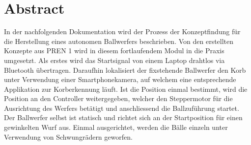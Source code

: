 
\section*{Abstract}
In der nachfolgenden Dokumentation wird der Prozess der Konzeptfindung für die Herstellung eines
autonomen Ballwerfers beschrieben. Von den erstellten Konzepte aus PREN 1 wird in diesem fortlaufendem Modul in die Praxis umgesetzt.
Als
erstes wird das Startsignal von einem Laptop drahtlos via Bluetooth übertragen. Daraufhin lokalisiert
der fixstehende Ballwerfer den Korb unter Verwendung einer Smartphonekamera, auf welchem eine
entsprechende Applikation zur Korberkennung läuft. Ist die Position einmal bestimmt, wird die Position
an den Controller weitergegeben, welcher den Steppermotor für die Ausrichtung des Werfers betätigt und
anschliessend die Ballzuführung startet. Der Ballwerfer selbst ist statisch und richtet sich an der
Startposition für einen gewinkelten Wurf aus. Einmal ausgerichtet, werden die Bälle einzeln unter
Verwendung von Schwungrädern geworfen.

